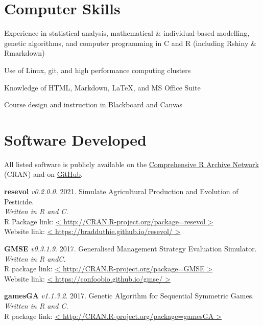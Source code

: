 \documentclass[letterpaper]{article}
\renewenvironment{itemize}{
  \begin{list}{}{
    \setlength{\leftmargin}{1.5em}
  }
}{
  \end{list}
}
\begin{document}
\section*{Computer Skills}
\begin{itemize}
\item Experience in statistical analysis, mathematical \& individual-based modelling, genetic algorithms, and computer programming in C and R (including Rshiny \& Rmarkdown) %
\item Use of Linux, git, and high performance computing clusters
\item Knowledge of HTML, Markdown, \LaTeX, and MS Office Suite
\item Course design and instruction in Blackboard and Canvas
\end{itemize}

\section*{Software Developed}

All listed software is publicly available on the \href{https://cran.r-project.org/}{Comprehensive R Archive Network} (CRAN) and on \href{https://github.com/bradduthie}{GitHub}.

\begin{etaremune}
\item {\bf resevol} {\it v0.2.0.0}. 2021. Simulate Agricultural Production and Evolution of Pesticide. \\
{\it Written in R and C.} \\
R Package link:  \href{http://CRAN.R-project.org/package=resevol}{< http://CRAN.R-project.org/package=resevol >} \\
Website link: \href{https://bradduthie.github.io/resevol/}{< https://bradduthie.github.io/resevol/ >}
\item {\bf GMSE} {\it v0.3.1.9}. 2017. Generalised Management Strategy Evaluation Simulator. {\it Written in R andC.} \\
R package link: \href{http://CRAN.R-project.org/package=GMSE}{< http://CRAN.R-project.org/package=GMSE >} \\
Website link: \href{https://confoobio.github.io/gmse/}{< https://confoobio.github.io/gmse/ >}
\item {\bf gamesGA} {\it v1.1.3.2}. 2017. Genetic Algorithm for Sequential Symmetric Games. {\it Written in R and C.} \\
R package link: \href{http://CRAN.R-project.org/package=gamesGA}{< http://CRAN.R-project.org/package=gamesGA >}
\end{etaremune}
\end{document}
